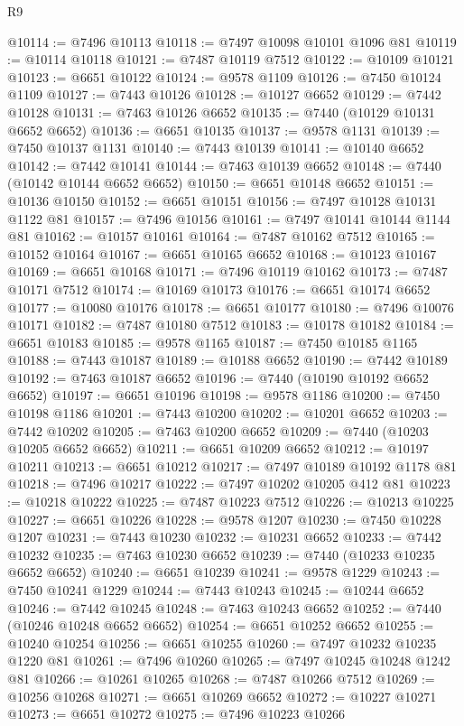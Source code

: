 \begin{lexlean}{R9}
\begin{coremodule}
{{{{{{{{{{{{{{{{{{{{{{{{{{{{{{{{{{{{{{{{{{{{{{{{{{{{{{{{{{{{{{{{{{{{{{{{{{{{{{{{{{{{@10114 := @7496 @10113
@10118 := @7497 @10098 @10101 @1096 @81
@10119 := @10114 @10118
@10121 := @7487 @10119 @7512
@10122 := @10109 @10121
@10123 := @6651 @10122
@10124 := @9578 @1109
@10126 := @7450 @10124 @1109
@10127 := @7443 @10126
@10128 := @10127 @6652
@10129 := @7442 @10128
@10131 := @7463 @10126 @6652
@10135 := @7440 (@10129 @10131 @6652 @6652)
@10136 := @6651 @10135
@10137 := @9578 @1131
@10139 := @7450 @10137 @1131
@10140 := @7443 @10139
@10141 := @10140 @6652
@10142 := @7442 @10141
@10144 := @7463 @10139 @6652
@10148 := @7440 (@10142 @10144 @6652 @6652)
@10150 := @6651 @10148 @6652
@10151 := @10136 @10150
@10152 := @6651 @10151
@10156 := @7497 @10128 @10131 @1122 @81
@10157 := @7496 @10156
@10161 := @7497 @10141 @10144 @1144 @81
@10162 := @10157 @10161
@10164 := @7487 @10162 @7512
@10165 := @10152 @10164
@10167 := @6651 @10165 @6652
@10168 := @10123 @10167
@10169 := @6651 @10168
@10171 := @7496 @10119 @10162
@10173 := @7487 @10171 @7512
@10174 := @10169 @10173
@10176 := @6651 @10174 @6652
@10177 := @10080 @10176
@10178 := @6651 @10177
@10180 := @7496 @10076 @10171
@10182 := @7487 @10180 @7512
@10183 := @10178 @10182
@10184 := @6651 @10183
@10185 := @9578 @1165
@10187 := @7450 @10185 @1165
@10188 := @7443 @10187
@10189 := @10188 @6652
@10190 := @7442 @10189
@10192 := @7463 @10187 @6652
@10196 := @7440 (@10190 @10192 @6652 @6652)
@10197 := @6651 @10196
@10198 := @9578 @1186
@10200 := @7450 @10198 @1186
@10201 := @7443 @10200
@10202 := @10201 @6652
@10203 := @7442 @10202
@10205 := @7463 @10200 @6652
@10209 := @7440 (@10203 @10205 @6652 @6652)
@10211 := @6651 @10209 @6652
@10212 := @10197 @10211
@10213 := @6651 @10212
@10217 := @7497 @10189 @10192 @1178 @81
@10218 := @7496 @10217
@10222 := @7497 @10202 @10205 @412 @81
@10223 := @10218 @10222
@10225 := @7487 @10223 @7512
@10226 := @10213 @10225
@10227 := @6651 @10226
@10228 := @9578 @1207
@10230 := @7450 @10228 @1207
@10231 := @7443 @10230
@10232 := @10231 @6652
@10233 := @7442 @10232
@10235 := @7463 @10230 @6652
@10239 := @7440 (@10233 @10235 @6652 @6652)
@10240 := @6651 @10239
@10241 := @9578 @1229
@10243 := @7450 @10241 @1229
@10244 := @7443 @10243
@10245 := @10244 @6652
@10246 := @7442 @10245
@10248 := @7463 @10243 @6652
@10252 := @7440 (@10246 @10248 @6652 @6652)
@10254 := @6651 @10252 @6652
@10255 := @10240 @10254
@10256 := @6651 @10255
@10260 := @7497 @10232 @10235 @1220 @81
@10261 := @7496 @10260
@10265 := @7497 @10245 @10248 @1242 @81
@10266 := @10261 @10265
@10268 := @7487 @10266 @7512
@10269 := @10256 @10268
@10271 := @6651 @10269 @6652
@10272 := @10227 @10271
@10273 := @6651 @10272
@10275 := @7496 @10223 @10266
}}}}}}}}}}}}}}}}}}}}}}}}}}}}}}}}}}}}}}}}}}}}}}}}}}}}}}}}}}}}}}}}}}}}}}}}}}}}}}}}}}}}
\end{coremodule}
\end{lexlean}
